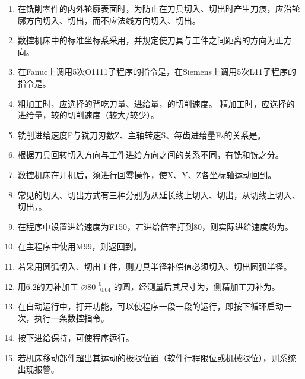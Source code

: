 \documentclass[12pt,twocolumn,landscape,UTF8,twoside]{ctexart}
\begin{document}
\begin{spacing}{1}
\begin{enumerate} [1.]
\item 在铣削零件的内外轮廓表面时，为防止在刀具切入、切出时产生刀痕，应沿轮廓方向切入、切出，而不应法线方向切入、切出。

\item 数控机床中的标准坐标系采用，并规定使刀具与工件之间距离的方向为正方向。

\item 在Fanuc上调用5次O1111子程序的指令是，在Siemens上调用5次L11子程序的指令是。

\item 粗加工时，应选择的背吃刀量、进给量，的切削速度。
精加工时，应选择的进给量，较的切削速度（较大/较少）。

\item 铣削进给速度F与铣刀刃数Z、主轴转速S、每齿进给量Fz的关系是。

\item 根据刀具回转切入方向与工件进给方向之间的关系不同，有铣和铣之分。

\item 数控机床在开机后，须进行回零操作，使X、Y、Z各坐标轴运动回到。

\item 常见的切入、切出方式有三种分别为从延长线上切入、切出，从切线上切入、切出，。

\item 在程序中设置进给速度为F150，若进给倍率打到80，则实际进给速度约为。

\item 在主程序中使用M99，则返回到。

\item 若采用圆弧切入、切出工件，则刀具半径补偿值必须切入、切出圆弧半径。

\item 用6.2的刀补加工 $\diameter 80^{~\;0}_{-0.04}$ 的圆，经测量后其尺寸为，侧精加工刀补为。

\item 在自动运行中，打开功能，可以使程序一段一段的运行，即按下循环启动一次，执行一条数控指令。

\item 按下进给保持，可使程序运行。

\item 若机床移动部件超出其运动的极限位置（软件行程限位或机械限位），则系统出现报警。


\end{enumerate}
\end{spacing}
\end{document}
